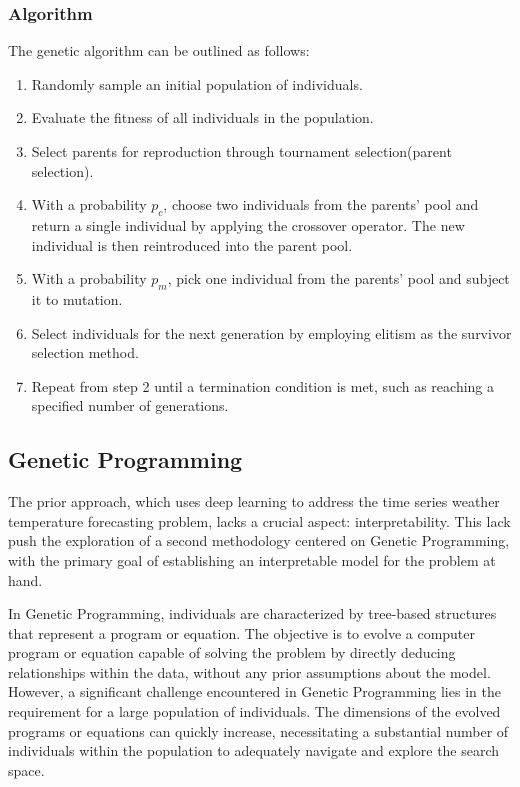 \subsubsection{Algorithm} 
The genetic algorithm can be outlined as follows:

\begin{enumerate}
    \item Randomly sample an initial population of individuals.
    \item Evaluate the fitness of all individuals in the population.
    \item Select parents for reproduction through tournament selection(parent selection).
    \item With a probability $p_{c}$, choose two individuals from the parents' pool and return a single individual by applying the crossover operator. The new individual is then reintroduced into the parent pool.
    \item With a probability $p_{m}$, pick one individual from the parents' pool and subject it to mutation.
    \item Select individuals for the next generation by employing elitism as the survivor selection method.
    \item Repeat from step 2 until a termination condition is met, such as reaching a specified number of generations.
\end{enumerate}


\subsection{Genetic Programming}
The prior approach, which uses deep learning to address the time series weather temperature forecasting problem, lacks a crucial aspect: interpretability. This lack push the exploration of a second methodology centered on Genetic Programming, with the primary goal of establishing an interpretable model for the problem at hand.

In Genetic Programming, individuals are characterized by tree-based structures that represent a program or equation. The objective is to evolve a computer program or equation capable of solving the problem by directly deducing relationships within the data, without any prior assumptions about the model. However, a significant challenge encountered in Genetic Programming lies in the requirement for a large population of individuals. The dimensions of the evolved programs or equations can quickly increase, necessitating a substantial number of individuals within the population to adequately navigate and explore the search space.

